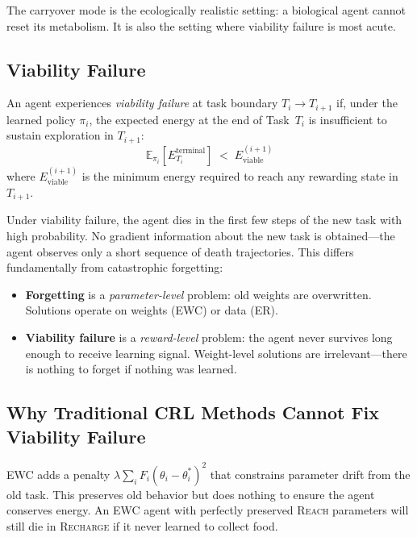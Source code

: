 \documentclass{article}
\newcommand{\energy}{E}
\begin{document}
The carryover mode is the ecologically realistic setting: a biological
agent cannot reset its metabolism. It is also the setting where viability
failure is most acute.

\subsection{Viability Failure}
\label{sec:viability}

\begin{definition}
An agent experiences \emph{viability failure} at task boundary $T_i \to T_{i+1}$
if, under the learned policy $\pi_i$, the expected energy at the end of
Task~$T_i$ is insufficient to sustain exploration in $T_{i+1}$:
\begin{equation}
  \mathbb{E}_{\pi_i}\!\left[\energy_{T_i}^{\mathrm{terminal}}\right]
  \;<\; \energy_{\mathrm{viable}}^{(i+1)}
\end{equation}
where $\energy_{\mathrm{viable}}^{(i+1)}$ is the minimum energy required to
reach any rewarding state in $T_{i+1}$.
\end{definition}

Under viability failure, the agent dies in the first few steps of the new
task with high probability. No gradient information about the new task is
obtained---the agent observes only a short sequence of death trajectories.
This differs fundamentally from catastrophic forgetting:

\begin{itemize}[leftmargin=*,topsep=1pt,itemsep=1pt]
  \item \textbf{Forgetting} is a \emph{parameter-level} problem: old
        weights are overwritten. Solutions operate on weights (EWC) or
        data (ER).
  \item \textbf{Viability failure} is a \emph{reward-level} problem: the
        agent never survives long enough to receive learning signal.
        Weight-level solutions are irrelevant---there is nothing to forget
        if nothing was learned.
\end{itemize}

\subsection{Why Traditional CRL Methods Cannot Fix Viability Failure}

EWC adds a penalty $\lambda \sum_i F_i (\theta_i - \theta_i^*)^2$ that
constrains parameter drift from the old task. This preserves old behavior
but does nothing to ensure the agent conserves energy. An EWC agent with
perfectly preserved \textsc{Reach} parameters will still die in
\textsc{Recharge} if it never learned to collect food.
\end{document}
